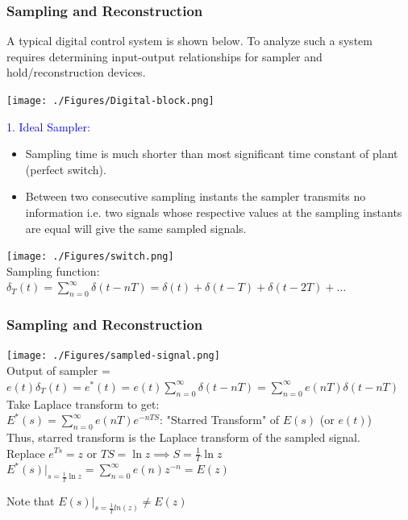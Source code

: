\documentclass[mathserif, 10pt]{beamer} %
\begin{document}
\frame
{

\small

\frametitle{Sampling and Reconstruction}
A typical digital control system is shown below.  To analyze such a system requires determining input-output relationships for sampler and hold/reconstruction devices.\\

\begin{center}
\texttt{[image: ./Figures/Digital-block.png]}
\end{center} \vspace{-.07in}

\textcolor{blue}{1. Ideal Sampler:}
\begin{itemize}
	\item Sampling time is much shorter than most
 significant time constant of plant (perfect switch).
 \item Between two consecutive sampling instants the sampler transmits no information i.e. two signals whose respective values at the sampling instants are equal will give the same sampled signals.
\end{itemize}
\texttt{[image: ./Figures/switch.png]} \\
Sampling function:\\
$\delta_T(t) = \sum\limits_{n=0}^{\infty} \delta(t-nT) = \delta(t) + \delta(t-T) + \delta(t-2T) + \hdots$ \vspace{.2in}






}
\frame
{

\small

\frametitle{Sampling and Reconstruction}

\texttt{[image: ./Figures/sampled-signal.png]}\\ \vspace{.05in}
Output of sampler = $e(t)\delta_T(t) = e^{*}(t) = e(t) \sum\limits_{n=0}^{\infty} \delta(t-nT) = \sum\limits_{n=0}^\infty e(nT) \delta(t-nT)$ \\
Take Laplace transform to get:\\
  $E^*(s) = \sum\limits_{n=0}^\infty e(nT) e^{-nTS}$:  "Starred Transform" of $E(s)$ (or $e(t)$)\\ \vspace{.2in}
  Thus, starred transform is the Laplace transform of the sampled signal. \\ \vspace{.2in}
Replace $e^{Ts}=z$ or $TS = \ln z  \implies S = \frac{1}{T} \ln z$\\
$E^*(s)|_{s=\frac{1}{T}\ln z } = \sum\limits_{n=0}^\infty e(n) z^{-n} = E(z)$\\ \vspace{.2in}

Note that  $E(s)|_{s = \frac{1}{T}ln(z)} \ne E(z)$


}
\end{document}
